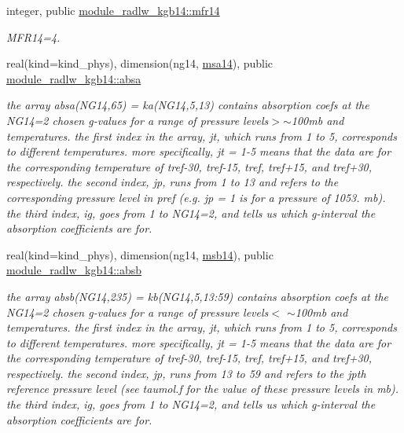 \begin{DoxyCompactItemize}
\mbox{\label{group__module__radlw__kgbnn_ga52354badbce95c005b19bd5a443fd488}} 
integer, public \hyperlink{group__module__radlw__kgbnn_ga52354badbce95c005b19bd5a443fd488}{module\+\_\+radlw\+\_\+kgb14\+::mfr14}
\begin{DoxyCompactList}\small\item\em M\+F\+R14=4. \end{DoxyCompactList}\item 
\mbox{\label{group__module__radlw__kgbnn_gab57cb029ede27280bc99641f39ab3a81}} 
real(kind=kind\+\_\+phys), dimension(ng14, \hyperlink{namespacemodule__radlw__kgb14_a9357fbaa5663438f0c0062a45c99a8d4}{msa14}), public \hyperlink{group__module__radlw__kgbnn_gab57cb029ede27280bc99641f39ab3a81}{module\+\_\+radlw\+\_\+kgb14\+::absa}
\begin{DoxyCompactList}\small\item\em the array absa(\+N\+G14,65) = ka(\+N\+G14,5,13) contains absorption coefs at the N\+G14=2 chosen g-\/values for a range of pressure levels$>$$\sim$100mb and temperatures. the first index in the array, jt, which runs from 1 to 5, corresponds to different temperatures. more specifically, jt = 1-\/5 means that the data are for the corresponding temperature of tref-\/30, tref-\/15, tref, tref+15, and tref+30, respectively. the second index, jp, runs from 1 to 13 and refers to the corresponding pressure level in pref (e.\+g. jp = 1 is for a pressure of 1053. mb). the third index, ig, goes from 1 to N\+G14=2, and tells us which g-\/interval the absorption coefficients are for. \end{DoxyCompactList}\item 
\mbox{\label{group__module__radlw__kgbnn_gaa7a122319c49f3c1e8d51d21771cb63d}} 
real(kind=kind\+\_\+phys), dimension(ng14, \hyperlink{group__module__radlw__kgbnn_ga2d400a2aa969f2b2b6efd15555b67159}{msb14}), public \hyperlink{group__module__radlw__kgbnn_gaa7a122319c49f3c1e8d51d21771cb63d}{module\+\_\+radlw\+\_\+kgb14\+::absb}
\begin{DoxyCompactList}\small\item\em the array absb(\+N\+G14,235) = kb(\+N\+G14,5,13\+:59) contains absorption coefs at the N\+G14=2 chosen g-\/values for a range of pressure levels$<$ $\sim$100mb and temperatures. the first index in the array, jt, which runs from 1 to 5, corresponds to different temperatures. more specifically, jt = 1-\/5 means that the data are for the corresponding temperature of tref-\/30, tref-\/15, tref, tref+15, and tref+30, respectively. the second index, jp, runs from 13 to 59 and refers to the jpth reference pressure level (see taumol.\+f for the value of these pressure levels in mb). the third index, ig, goes from 1 to N\+G14=2, and tells us which g-\/interval the absorption coefficients are for. \end{DoxyCompactList}\item 

\end{DoxyCompactItemize}
